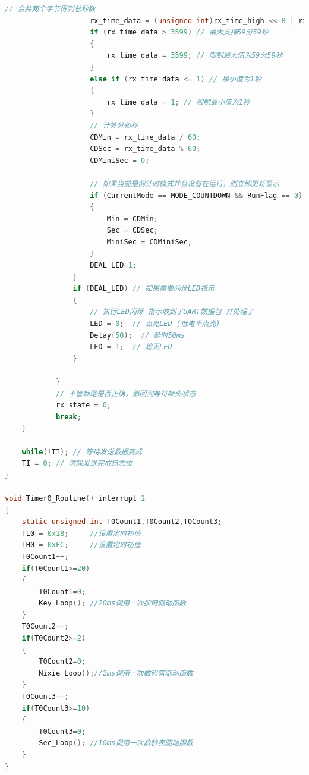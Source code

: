 \documentclass[12pt,hyperref,a4paper,UTF8]{ctexart}
\begin{document}
\begin{lstlisting}[language=C, caption={main.c 核心功能实现代码}]
					// 合并两个字节得到总秒数
					rx_time_data = (unsigned int)rx_time_high << 8 | rx_time_low;
					if (rx_time_data > 3599) // 最大支持59分59秒
					{
						rx_time_data = 3599; // 限制最大值为59分59秒
					}
					else if (rx_time_data <= 1) // 最小值为1秒
					{
						rx_time_data = 1; // 限制最小值为1秒
					}
					// 计算分和秒
					CDMin = rx_time_data / 60;
					CDSec = rx_time_data % 60;
					CDMiniSec = 0;
					
					// 如果当前是倒计时模式并且没有在运行，则立即更新显示
					if (CurrentMode == MODE_COUNTDOWN && RunFlag == 0)
					{
						Min = CDMin;
						Sec = CDSec;
						MiniSec = CDMiniSec;
					}
					DEAL_LED=1;
				}
				if (DEAL_LED) // 如果需要闪烁LED指示
				{
					// 执行LED闪烁 指示收到了UART数据包 并处理了
					LED = 0;  // 点亮LED (低电平点亮)
					Delay(50);  // 延时50ms
					LED = 1;  // 熄灭LED
				}

			}
			// 不管帧尾是否正确，都回到等待帧头状态
			rx_state = 0;
			break;
	}

	while(!TI);	// 等待发送数据完成
	TI = 0; // 清除发送完成标志位				
}

void Timer0_Routine() interrupt 1
{
	static unsigned int T0Count1,T0Count2,T0Count3;
	TL0 = 0x18;		//设置定时初值
	TH0 = 0xFC;		//设置定时初值
	T0Count1++;
	if(T0Count1>=20)
	{
		T0Count1=0;
		Key_Loop();	//20ms调用一次按键驱动函数
	}
	T0Count2++;
	if(T0Count2>=2)
	{
		T0Count2=0;
		Nixie_Loop();//2ms调用一次数码管驱动函数
	}
	T0Count3++;
	if(T0Count3>=10)
	{
		T0Count3=0;
		Sec_Loop();	//10ms调用一次数秒表驱动函数
	}
}

\end{lstlisting}
\end{document}
